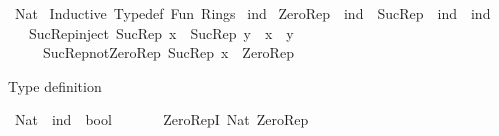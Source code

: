 %
\begin{isabellebody}%
%
%
\isadelimdocument
%
\endisadelimdocument
%
\isatagdocument
%
\isamarkuptrue%
%
\endisatagdocument
{\isafolddocument}%
%
\isadelimdocument
%
\endisadelimdocument
%
\isadelimtheory
%
\endisadelimtheory
%
\isatagtheory
{}\isamarkupfalse%
\ Nat\isanewline
{}\ Inductive\ Typedef\ Fun\ Rings\isanewline
{}%
\endisatagtheory
{\isafoldtheory}%
%
\isadelimtheory
%
\endisadelimtheory
%
\isadelimdocument
%
\endisadelimdocument
%
\isatagdocument
%
\isamarkuptrue%
%
\endisatagdocument
{\isafolddocument}%
%
\isadelimdocument
%
\endisadelimdocument
{}\isamarkupfalse%
\ ind\isanewline
\isanewline
{}\isamarkupfalse%
\ Zero{\isacharunderscore}{\kern0pt}Rep\ {\isacharcolon}{\kern0pt}{\isacharcolon}{\kern0pt}\ ind\ \ Suc{\isacharunderscore}{\kern0pt}Rep\ {\isacharcolon}{\kern0pt}{\isacharcolon}{\kern0pt}\ {\isachardoublequoteopen}ind\ {\isasymRightarrow}\ ind{\isachardoublequoteclose}\isanewline
\ \ %
\isanewline
\ \ \ Suc{\isacharunderscore}{\kern0pt}Rep{\isacharunderscore}{\kern0pt}inject{\isacharcolon}{\kern0pt}\ {\isachardoublequoteopen}Suc{\isacharunderscore}{\kern0pt}Rep\ x\ {\isacharequal}{\kern0pt}\ Suc{\isacharunderscore}{\kern0pt}Rep\ y\ {\isasymLongrightarrow}\ x\ {\isacharequal}{\kern0pt}\ y{\isachardoublequoteclose}\isanewline
\ \ \ \ \ Suc{\isacharunderscore}{\kern0pt}Rep{\isacharunderscore}{\kern0pt}not{\isacharunderscore}{\kern0pt}Zero{\isacharunderscore}{\kern0pt}Rep{\isacharcolon}{\kern0pt}\ {\isachardoublequoteopen}Suc{\isacharunderscore}{\kern0pt}Rep\ x\ {\isasymnoteq}\ Zero{\isacharunderscore}{\kern0pt}Rep{\isachardoublequoteclose}%
\isadelimdocument
%
\endisadelimdocument
%
\isatagdocument
%
\isamarkuptrue%
%
\endisatagdocument
{\isafolddocument}%
%
\isadelimdocument
%
\endisadelimdocument
%
\begin{isamarkuptext}%
Type definition%
\end{isamarkuptext}\isamarkuptrue%
\isamarkupfalse%
\ Nat\ {\isacharcolon}{\kern0pt}{\isacharcolon}{\kern0pt}\ {\isachardoublequoteopen}ind\ {\isasymRightarrow}\ bool{\isachardoublequoteclose}\isanewline
\ \ \isanewline
\ \ \ \ Zero{\isacharunderscore}{\kern0pt}RepI{\isacharcolon}{\kern0pt}\ {\isachardoublequoteopen}Nat\ Zero{\isacharunderscore}{\kern0pt}Rep{\isachardoublequoteclose}\isanewline

\end{isabellebody}
